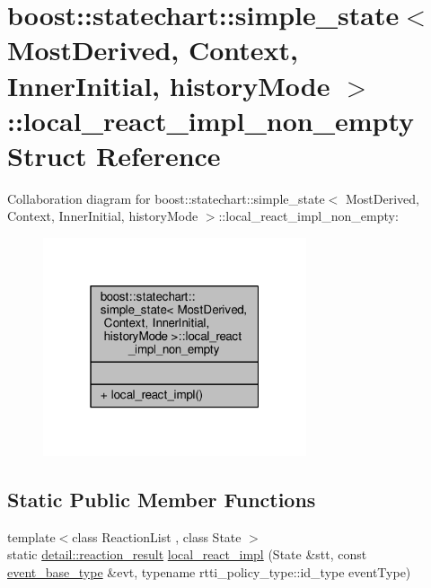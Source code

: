 \hypertarget{structboost_1_1statechart_1_1simple__state_1_1local__react__impl__non__empty}{}\section{boost\+:\+:statechart\+:\+:simple\+\_\+state$<$ Most\+Derived, Context, Inner\+Initial, history\+Mode $>$\+:\+:local\+\_\+react\+\_\+impl\+\_\+non\+\_\+empty Struct Reference}
\label{structboost_1_1statechart_1_1simple__state_1_1local__react__impl__non__empty}


Collaboration diagram for boost\+:\+:statechart\+:\+:simple\+\_\+state$<$ Most\+Derived, Context, Inner\+Initial, history\+Mode $>$\+:\+:local\+\_\+react\+\_\+impl\+\_\+non\+\_\+empty\+:
\nopagebreak
\begin{figure}[H]
\begin{center}
\leavevmode
\includegraphics[width=220pt]{structboost_1_1statechart_1_1simple__state_1_1local__react__impl__non__empty__coll__graph}
\end{center}
\end{figure}
\subsection*{Static Public Member Functions}
\begin{DoxyCompactItemize}
\item 
{\footnotesize template$<$class Reaction\+List , class State $>$ }\\static \mbox{\hyperlink{namespaceboost_1_1statechart_1_1detail_ab091bbb4c29327fb46ee479ea1b7255b}{detail\+::reaction\+\_\+result}} \mbox{\hyperlink{structboost_1_1statechart_1_1simple__state_1_1local__react__impl__non__empty_aca7a8dae81c5f8d27405d1c267d9556f}{local\+\_\+react\+\_\+impl}} (State \&stt, const \mbox{\hyperlink{classboost_1_1statechart_1_1simple__state_a153e115715f5d828021a273ce282ba9b}{event\+\_\+base\+\_\+type}} \&evt, typename rtti\+\_\+policy\+\_\+type\+::id\+\_\+type event\+Type)
\end{DoxyCompactItemize}


